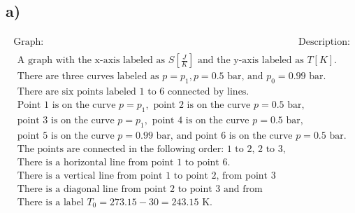

\subsection*{a)}

\[
\begin{array}{c}
\begin{array}{c|c}
\text{Graph:} & \text{Description:} \\
\hline
\begin{array}{c}
\text{A graph with the x-axis labeled as } S \left[\frac{J}{K}\right] \text{ and the y-axis labeled as } T[K]. \\
\text{There are three curves labeled as } p = p_1, p = 0.5 \text{ bar, and } p_0 = 0.99 \text{ bar.} \\
\text{There are six points labeled 1 to 6 connected by lines.} \\
\text{Point 1 is on the curve } p = p_1, \text{ point 2 is on the curve } p = 0.5 \text{ bar,} \\
\text{point 3 is on the curve } p = p_1, \text{ point 4 is on the curve } p = 0.5 \text{ bar,} \\
\text{point 5 is on the curve } p = 0.99 \text{ bar, and point 6 is on the curve } p = 0.5 \text{ bar.} \\
\text{The points are connected in the following order: 1 to 2, 2 to 3, 3 to 4, 4 to 5, 5 to 6.} \\
\text{There is a horizontal line from point 1 to point 6.} \\
\text{There is a vertical line from point 1 to point 2, from point 3 to point 4, and from point 5 to point 6.} \\
\text{There is a diagonal line from point 2 to point 3 and from point 4 to point 5.} \\
\text{There is a label } T_0 = 273.15 - 30 = 243.15 \text{ K.}
\end{array}
\end{array}
\end{array}
\]
